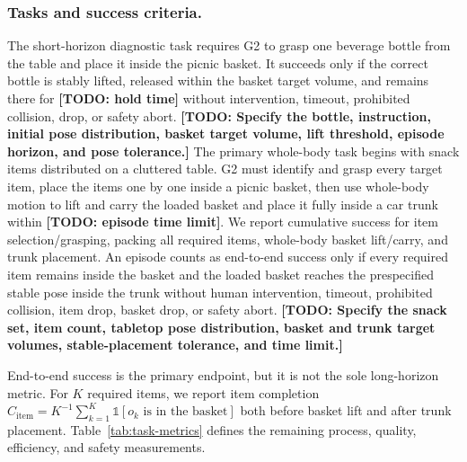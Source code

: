 \documentclass[letterpaper,10pt,conference]{ieeeconf}
\newcommand{\todo}[1]{\textbf{[TODO: #1]}}
\begin{document}
\subsubsection{Tasks and success criteria.}
The short-horizon diagnostic task requires G2 to grasp one beverage bottle from
the table and place it inside the picnic basket. It succeeds only if the correct
bottle is stably lifted, released within the basket target volume, and remains
there for \todo{hold time} without intervention, timeout, prohibited collision,
drop, or safety abort. \todo{Specify the bottle, instruction, initial pose
distribution, basket target volume, lift threshold, episode horizon, and pose
tolerance.} The primary
whole-body task begins with snack items distributed on a cluttered table. G2
must identify and grasp every target item, place the items one by one inside a
picnic basket, then use whole-body motion to lift and carry the loaded basket and
place it fully inside a car trunk within \todo{episode time limit}. We report
cumulative success for item selection/grasping, packing all required items,
whole-body basket lift/carry, and trunk placement. An episode counts as
end-to-end success only if every required item remains inside the basket and the
loaded basket reaches the prespecified stable pose inside the trunk without
human intervention, timeout, prohibited collision, item drop, basket drop, or
safety abort. \todo{Specify the snack set, item count, tabletop pose distribution,
basket and trunk target volumes, stable-placement tolerance, and time limit.}

End-to-end success is the primary endpoint, but it is not the sole long-horizon
metric. For $K$ required items, we report item completion
$C_{\mathrm{item}}=K^{-1}\sum_{k=1}^{K}\mathbb{1}[o_k\text{ is in the basket}]$
both before basket lift and after trunk placement. Table~\ref{tab:task-metrics}
defines the remaining process, quality, efficiency, and safety measurements.
\end{document}
